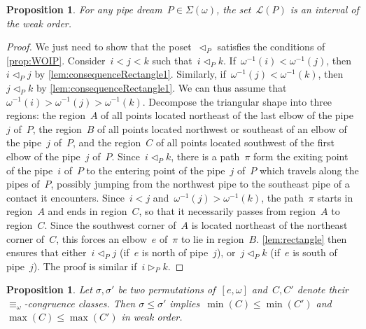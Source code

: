 \documentclass{amsart}
\newtheorem{proposition}[theorem]{Proposition}
\theoremstyle{definition}
\newcommand{\acyclicPipeDreams}{\Sigma} %
\newcommand{\linearExtensions}{\mathcal{L}} %
\newcommand{\less}{\vartriangleleft} %
\newcommand{\more}{\vartriangleright} %
\newcommand{\contactLess}[1]{\less_{#1}} %
\newcommand{\contactMore}[1]{\more_{#1}} %
\begin{document}
\begin{proposition}
\label{prop:intervals}
For any pipe dream~$P \in \acyclicPipeDreams(\omega)$, the set~$\linearExtensions(P)$ is an interval of the weak order.
\end{proposition}

\begin{proof}
We just need to show that the poset~$\contactLess{P}$ satisfies the conditions of \cref{prop:WOIP}.
Consider~$i < j < k$ such that~$i \contactLess{P} k$.
If~$\omega^{-1}(i) < \omega^{-1}(j)$, then~$i \contactLess{P} j$ by \cref{lem:consequenceRectangle1}.
Similarly, if~$\omega^{-1}(j) < \omega^{-1}(k)$, then~$j \contactLess{P} k$ by \cref{lem:consequenceRectangle1}.
We can thus assume that~${\omega^{-1}(i) > \omega^{-1}(j) > \omega^{-1}(k)}$.
Decompose the triangular shape into three regions: the region~$A$ of all points located northeast of the last elbow of the pipe~$j$ of~$P$, the region~$B$ of all points located northwest or southeast of an elbow of the pipe~$j$ of~$P$, and the region~$C$ of all points located southwest of the first elbow of the pipe~$j$ of~$P$.
Since~$i \contactLess{P} k$, there is a path~$\pi$ form the exiting point of the pipe~$i$ of~$P$ to the entering point of the pipe~$j$ of~$P$ which travels along the pipes of~$P$, possibly jumping from the northwest pipe to the southeast pipe of a contact it encounters.
Since~$i < j$ and~$\omega^{-1}(j) > \omega^{-1}(k)$, the path~$\pi$ starts in region~$A$ and ends in region~$C$, so that it necessarily passes from region~$A$ to region~$C$.
Since the southwest corner of~$A$ is located northeast of the northeast corner of~$C$, this forces an elbow~$e$ of~$\pi$ to lie in region~$B$.
\cref{lem:rectangle} then ensures that either~$i \contactLess{P} j$ (if~$e$ is north of pipe~$j$), or~$j \contactLess{P} k$ (if~$e$ is south of pipe~$j$).
The proof is similar if~$i \contactMore{P} k$.
\end{proof}

\begin{proposition}
\label{prop:orderPreserving}
Let $\sigma, \sigma'$ be two permutations of~$[e, \omega]$ and~$C, C'$ denote their $\equiv_\omega$-congruence classes.
Then $\sigma \le \sigma'$ implies~$\min(C) \le \min(C')$ and $\max(C) \le \max(C')$ in weak order.
\end{proposition}
\end{document}
